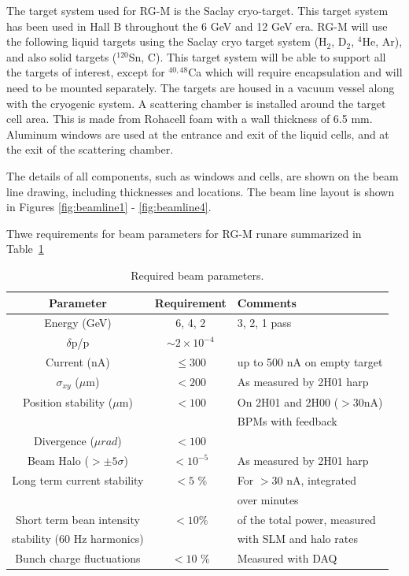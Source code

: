 \documentclass[12pt]{article}
\begin{document}
The target system used for RG-M is the Saclay cryo-target.  This target system has been used in Hall B throughout the 6 GeV and 12 GeV era. RG-M will use the following liquid targets using the Saclay cryo target system (H$_2$, D$_2$, ${}^{4}$He, Ar), and also solid targets (${}^{120}$Sn, C). This target system will be able to support all the targets of interest, except for ${}^{40,48}$Ca which will require encapsulation and will need to be mounted separately. The targets are housed in a vacuum vessel along with the cryogenic system.  A scattering chamber is installed around the target cell area.  This is made from Rohacell foam with a wall thickness of 6.5 mm.  Aluminum windows are used at the entrance and exit of the liquid cells, and at the exit of the scattering chamber.

The details of all components, such as windows and cells, are shown on the beam line drawing, including thicknesses and locations.  The beam line layout is shown in Figures \ref{fig:beamline1} - \ref{fig:beamline4}.


Thwe requirements for beam parameters for RG-M runare summarized in Table~\ref{tab:beam_par}

 \begin{table}[htb]
\caption{Required beam parameters.}\label{tab:beam_par}
\centering
 \begin{tabular}{|c|c|l|}
\hline
Parameter & Requirement &Comments \\ \hline 
Energy (GeV) & 6, 4, 2   & 3, 2, 1 pass  \\  \hline
$\delta$p/p & $\sim 2\times 10^{-4}$ & \\ \hline 
Current (nA) & $\le 300$ &up to 500 nA on empty target  \\  \hline
$\sigma_{xy}$ ($\mu$m) &$ < 200$& As measured by 2H01 harp \\ \hline 
Position stability ($\mu$m) & $< 100$ & On 2H01 and 2H00 ($>30$nA) \\ 
&&BPMs with feedback \\ \hline
Divergence ($\mu rad$) & $< 100$&  \\ \hline 
Beam Halo ($> \pm 5\sigma$) &$< 10^{-5}$&As measured by 2H01 harp \\ \hline
Long term current stability & $< 5$ \% & For $>30$ nA, integrated \\
&&over minutes \\ \hline 
Short term bean intensity & $<10$\%& of the total power, measured \\stability (60 Hz harmonics) && with SLM and halo rates \\ \hline
Bunch charge fluctuations &$< 10$ \% & Measured with DAQ \\ \hline
 \end{tabular}
\end{table}
\end{document}

